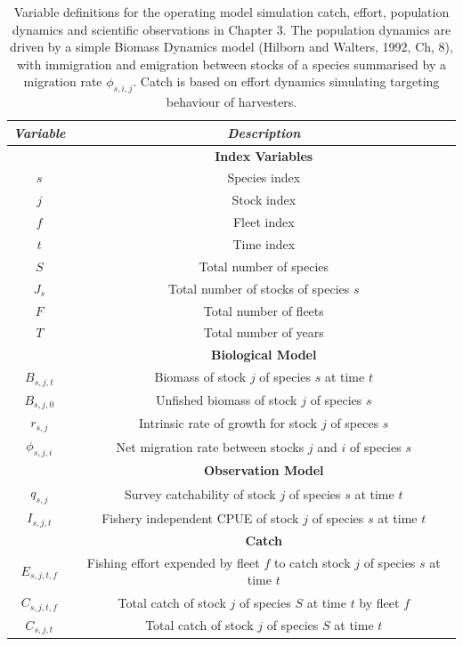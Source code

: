 \documentclass[]{scrartcl}
\begin{document}
\newpage

\begin{table}[htbp]
\begin{center}
\caption{Variable definitions for the operating model simulation catch, effort, population dynamics and scientific observations in Chapter 3. The population dynamics are driven by a simple Biomass Dynamics model (Hilborn and Walters, 1992, Ch, 8), with immigration and emigration between stocks of a species summarised by a migration rate $\phi_{s,i,j}$. Catch is based on effort dynamics simulating targeting behaviour of harvesters.}\label{tab:OMspec}
\begin{tabular}{c|c}
\textit{Variable} & \textit{Description}  \\
\hline
& \textbf{ Index Variables} \\
\hline
$s$ & Species index \\
$j$ & Stock index \\
$f$ & Fleet index \\
$t$ & Time index \\
$S$ & Total number of species \\
$J_s$ & Total number of stocks of species $s$ \\
$F$ & Total number of fleets \\
$T$ & Total number of years \\
\hline
& \textbf{ Biological Model} \\
\hline
$B_{s,j,t}$ & Biomass of stock $j$ of species $s$ at time $t$ \\
$B_{s,j,0}$ & Unfished biomass of stock $j$ of species $s$ \\
$r_{s,j}$ & Intrinsic rate of growth for stock $j$ of speces $s$ \\
$\phi_{s,j,i}$ &  Net migration rate between stocks $j$ and $i$ of species $s$ \\
\hline
& \textbf{ Observation Model} \\
\hline
$q_{s,j}$ & Survey catchability of stock $j$ of species $s$ at time $t$ \\
$I_{s,j,t}$ & Fishery independent CPUE of stock $j$ of species $s$ at time $t$ \\
\hline
& \textbf{ Catch} \\
\hline
$E_{s,j,t,f}$ & Fishing effort expended by fleet $f$ to catch stock $j$ of species $s$ at time $t$ \\
$C_{s,j,t,f}$ & Total catch of stock $j$ of species $S$ at time $t$ by fleet $f$ \\
$C_{s,j,t}$ & Total catch of stock $j$ of species $S$ at time $t$ \\

\end{tabular}
\end{center}
\end{table}
\end{document}
